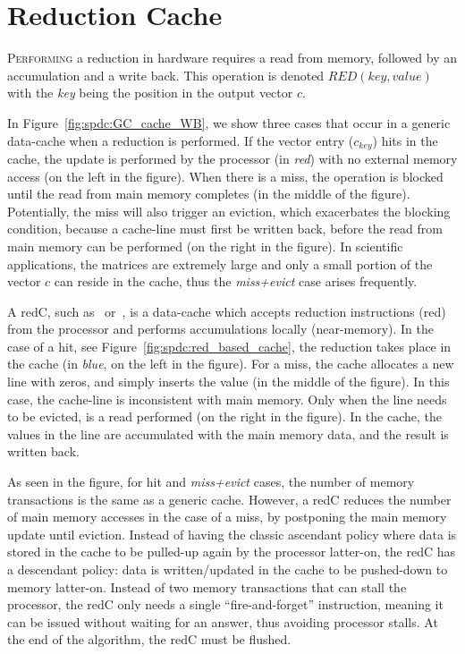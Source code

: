 
\section{Reduction Cache}
\label{sec:spdc:redc}

\lettrine{P}{erforming} a \gls{reduction} in hardware requires a read from memory, followed by an accumulation and a write back.
This operation is denoted $\mathit{RED}(key, value)$~\cite{Srikanth2021_SortCache} with the \emph{key} being the position in the output vector $c$.

In Figure~\ref{fig:spdc:GC_cache_WB}, we show three cases that occur in a generic data-cache when a \gls{reduction} is performed.
If the vector entry ($c_{key}$) \glspl{hit} in the cache, the update is performed by the processor (in \textit{red}) with no external memory access (on the left in the figure).
When there is a \gls{miss}, the operation is blocked until the read from main memory completes (in the middle of the figure).
Potentially, the \gls{miss} will also trigger an \gls{eviction}, which exacerbates the blocking condition, because a cache-line must first be written back, before the read from main memory can be performed (on the right in the figure).
In scientific applications, the matrices are extremely large and only a small portion of the vector $c$ can reside in the cache, thus the \emph{miss+evict} case arises frequently.

A \gls{redC}, such as~\cite{Srikanth2021_SortCache} or~\cite{Mukkara2019_PHI}, is a data-cache which accepts \gls{reduction} instructions (\acrshort{red}) from the processor and performs accumulations locally (near-memory).
In the case of a \gls{hit}, see Figure~\ref{fig:spdc:red_based_cache}, the \gls{reduction} takes place in the cache (in \textit{blue}, on the left in the figure).
For a \gls{miss}, the cache allocates a new line with zeros, and simply inserts the value (in the middle of the figure).
In this case, the cache-line is inconsistent with main memory.
Only when the line needs to be evicted, is a read performed (on the right in the figure).
In the cache, the values in the line are accumulated with the main memory data, and the result is written back.

As seen in the figure, for \gls{hit} and \emph{miss+evict} cases, the number of memory transactions is the same as a generic cache.
However, a \gls{redC} reduces the number of main memory accesses in the case of a \gls{miss}, by postponing the main memory update until \gls{eviction}.
Instead of having the classic ascendant policy where data is stored in the cache to be pulled-up again by the processor latter-on, the \gls{redC} has a descendant policy: data is written/updated in the cache to be pushed-down to memory latter-on.
Instead of two memory transactions that can stall the processor, the \gls{redC} only needs a single ``fire-and-forget'' instruction, meaning it can be issued without waiting for an answer, thus avoiding processor stalls.
At the end of the algorithm, the \gls{redC} must be flushed.

